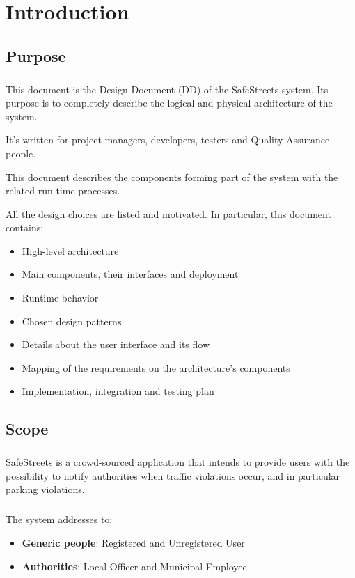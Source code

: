 	\chapter{Introduction}
		\section{Purpose}
			\paragraph{}
					This document is the Design Document (DD) of the SafeStreets system. Its purpose is to completely describe the logical and physical architecture of the system.
					
					It's written for project managers, developers, testers and Quality Assurance people.
					
					This document describes	the	components forming part of the	system with the related run-time processes.
					
					All the	design choices are listed and motivated. In particular, this document contains:
						\begin{itemize}
							\item  High-level architecture
							\item Main	components, their interfaces and deployment
							\item Runtime behavior
							\item Chosen design	patterns
							\item Details about	the	user interface and its flow
							\item Mapping of the requirements on the architecture's components
							\item Implementation, integration and testing plan
						\end{itemize}

		\section{Scope}
			\paragraph{}
				SafeStreets is a crowd{-}sourced application that intends to provide users with the possibility to notify authorities when traffic violations occur, and in particular parking violations.
				
			\paragraph{}
				The system addresses to:
				\begin{itemize}
					\item \textbf{Generic people}: Registered and Unregistered User
					\item \textbf{Authorities}: Local Officer and Municipal Employee
				\end{itemize}
				
